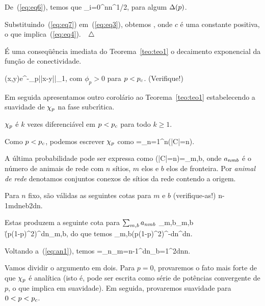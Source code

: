 De~(\ref{eq:eq6}), temos que
\beq
\label{eq:eq7}
\sum_{i=0}^n\gpi\leq\dep n^{1/2},
\eeq
para algum $\Delta(p)$.

Substituindo~(\ref{eq:eq7}) em~(\ref{eq:eq3}), obtemos 
\beq 
\label{eq:eq8} 
\gan\leq\gbn\exp\left[(\b-\a)-c(\b-\a)n^{1/2}\right], 
\eeq 
onde $c$ é uma constante positiva, o que implica~(\ref{eq:eq4}).$\quad\triangle$


\vs



É uma conseqüência imediata do Teorema~\ref{teo:teo1} o decaimento exponencial
da função de conectividade.

\vs

\bco
\beq
\label{eq:condec}
\tp(x,y)\leq e^{-\phi_{p}||x-y||_1},
\eeq
com $\phi_{p}>0$ para $p<p_c$.
\eco
(Verifique!)

\vs

Em seguida apresentamos outro corolário ao Teorema~\ref{teo:teo1} 
estabelecendo a suavidade de $\chi_p$ na fase 
subcr\'\i tica. 
 
\vs

\bco
$\chi_p$ é $k$ vezes diferenciável em $p<p_c$ para todo $k\geq1$.
\eco

\vs


Como $p<p_c$, podemos escrever $\chi_p$ como
\beq
\xip=\sum_{n=1}^\infty n\p(|C|=n).
\eeq

A última probabilidade pode ser expressa como 
\beq
\label{eq:an1}
\p(|C|=n)=\sum_{m,b}\anb\pem\qb,
\eeq
onde $a_{nmb}$ é o número de animais de rede com $n$ sítios, $m$ elos
e $b$ elos de fronteira. Por {\em animal de rede} denotamos conjuntos
conexos de sítios da rede contendo a origem.

Para $n$ fixo, são válidas as seguintes cotas para 
$m$ e $b$ (verifique-as!)
\beq
\label{eq:cotas}
n-1\leq m\leq dn\quad\mbox{e}\quad b\leq 2dn.
\eeq

Estas produzem a seguinte cota para $\sum_{m,b}a_{nmb}$
\geq\sum_{m,b}\anb\pem\qb\ge\sum_{m,b}\anb\pnd\qnd\\
\=(p(1-p)^2)^{dn}\sum_{m,b}\anb,
\eeqnn
do que temos
\beq
\label{eq:kes}
\sum_{m,b}\anb\leq(p(1-p)^2)^{-dn}^{dn}.
\eeq

Voltando a~(\ref{eq:an1}), temos
\beq
\label{eq:xip}
\xip=\sum_n\sum_{m=n-1}^{dn}\sum_{b=1}^{2dn}n\anb\pem\qb.
\eeq

Vamos dividir o argumento em dois. Para $p=0$,
provaremos o fato mais forte de que $\chi_p$ é analítica (isto é, pode ser
escrita como série de potências convergente de $p$, o que implica em suavidade).
Em seguida, provaremos suavidade para $0<p<p_c$.

